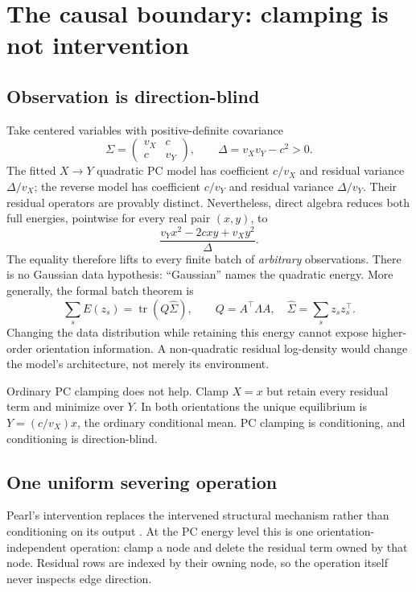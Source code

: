 \documentclass[11pt]{article}
\begin{document}
\appendix

\section{The causal boundary: clamping is not intervention}

\subsection{Observation is direction-blind}

Take centered variables with positive-definite covariance
\[
\Sigma=\begin{pmatrix}v_X&c\\c&v_Y\end{pmatrix},
\qquad \Delta=v_Xv_Y-c^2>0.
\]
The fitted $X\to Y$ quadratic PC model has coefficient $c/v_X$ and residual variance
$\Delta/v_X$; the reverse model has coefficient $c/v_Y$ and residual variance
$\Delta/v_Y$.  Their residual operators are provably distinct.  Nevertheless, direct
algebra reduces both full energies, pointwise for every real pair $(x,y)$, to
\[
\frac{v_Yx^2-2cxy+v_Xy^2}{\Delta}.
\]
The equality therefore lifts to every finite batch of \emph{arbitrary} observations.
There is no Gaussian data hypothesis: ``Gaussian'' names the quadratic energy.  More
generally, the formal batch theorem is
\[
\sum_s E(z_s)=\operatorname{tr}(Q\widehat\Sigma),
\qquad
Q=A^\top\Lambda A,
\quad
\widehat\Sigma=\sum_s z_s z_s^\top .
\]
Changing the data distribution while retaining this energy cannot expose higher-order
orientation information.  A non-quadratic residual log-density would change the model's
architecture, not merely its environment.

Ordinary PC clamping does not help.  Clamp $X=x$ but retain every residual term and
minimize over $Y$.  In both orientations the unique equilibrium is
$Y=(c/v_X)x$, the ordinary conditional mean.  PC clamping is conditioning, and
conditioning is direction-blind.

\subsection{One uniform severing operation}

Pearl's intervention replaces the intervened structural mechanism rather than
conditioning on its output \cite{pearl2012,halpern2000}.  At the PC energy level this is
one orientation-independent operation: clamp a node and delete the residual term owned
by that node.  Residual rows are indexed by their owning node, so the operation itself
never inspects edge direction.
\end{document}
